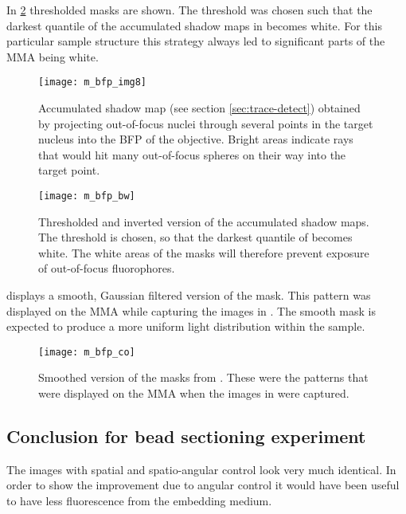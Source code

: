 In \ref{fig:m_bfp_bw} thresholded masks are shown. The threshold was
chosen such that the darkest quantile of the accumulated shadow maps
in  becomes white. For this particular sample
structure this strategy always led to significant parts of the MMA
being white.

\begin{figure}[H]
  \centering
  \texttt{[image: m\_bfp\_img8]}
  \caption{Accumulated shadow map (see section \ref{sec:trace-detect})
    obtained by projecting out-of-focus nuclei through several points
    in the target nucleus into the BFP of the objective. Bright areas
    indicate rays that would hit many out-of-focus spheres on their
    way into the target point.}
  \label{fig:m_bfp_img8}
\end{figure}

\begin{figure}[H]
  \centering
  \texttt{[image: m\_bfp\_bw]}
  \caption{Thresholded and inverted version of the accumulated shadow
    maps. The threshold is chosen, so that the darkest quantile of
     becomes white. The white areas of the
    masks will therefore prevent exposure of out-of-focus
    fluorophores.}
  \label{fig:m_bfp_bw}
\end{figure}

 displays a smooth, Gaussian filtered version of
the mask. This pattern was displayed on the MMA while capturing the
images in . The smooth mask is expected to
produce a more uniform light distribution within the sample.


\begin{figure}[H]
  \centering
  \texttt{[image: m\_bfp\_co]}
  \caption{Smoothed version of the masks from
    . These were the patterns that were displayed
    on the MMA when the images in  were captured.}
  \label{fig:m_bfp_co}
\end{figure}

\subsection{Conclusion for bead sectioning experiment}
The images with spatial  and spatio-angular control
 look very much identical. In order to show the
improvement due to angular control it would have been useful to have
less fluorescence from the embedding medium.

